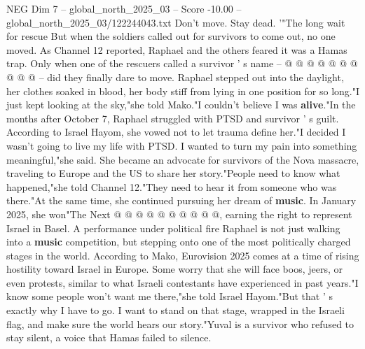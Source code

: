 \begin{textsample}{NEG Dim 7 – global\_north\_2025\_03 – Score -10.00 – global\_north\_2025\_03/122244043.txt}
Don't move.
Stay dead. '"The long wait for rescue But when the soldiers called out for survivors to come out, no one moved.
As Channel 12 reported, Raphael and the others feared it was a Hamas trap.
Only when one of the rescuers called a survivor ' s name -- @ @ @ @ @ @ @ @ @ @ -- did they finally dare to move.
Raphael stepped out into the daylight, her clothes soaked in blood, her body stiff from lying in one position for so long."I just kept looking at the sky,"she told Mako."I couldn't believe I was \textbf{alive}."In the months after October 7, Raphael struggled with PTSD and survivor ' s guilt.
According to Israel Hayom, she vowed not to let trauma define her."I decided I wasn't going to live my life with PTSD.
I wanted to turn my pain into something meaningful,"she said.
She became an advocate for survivors of the Nova massacre, traveling to Europe and the US to share her story."People need to know what happened,"she told Channel 12."They need to hear it from someone who was there."At the same time, she continued pursuing her dream of \textbf{music}.
In January 2025, she won"The Next @ @ @ @ @ @ @ @ @ @, earning the right to represent Israel in Basel.
A performance under political fire Raphael is not just walking into a \textbf{music} competition, but stepping onto one of the most politically charged stages in the world.
According to Mako, Eurovision 2025 comes at a time of rising hostility toward Israel in Europe.
Some worry that she will face boos, jeers, or even protests, similar to what Israeli contestants have experienced in past years."I know some people won't want me there,"she told Israel Hayom."But that ' s exactly why I have to go.
I want to stand on that stage, wrapped in the Israeli flag, and make sure the world hears our story."Yuval is a survivor who refused to stay silent, a voice that Hamas failed to silence.

\end{textsample}
